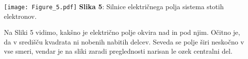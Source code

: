 \documentclass[a4paper,11pt]{article}
\begin{document}
    \begin{center}
    \texttt{[image: Figure\_5.pdf]}
    \textbf{Slika 5}: Silnice elektri\v cnega polja sistema stotih elektronov.
    \end{center}

    Na Sliki 5 vidimo, kak\v sno je elektri\v cno polje okvira nad in pod njim. O\v citno je, da v sredi\v s\v cu kvadrata
    ni nobenih nabitih delcev. Seveda se polje \v siri nesko\v cno v vse smeri, vendar je na sliki zaradi preglednosti narisan le
    ozek centralni del.
\end{document}
